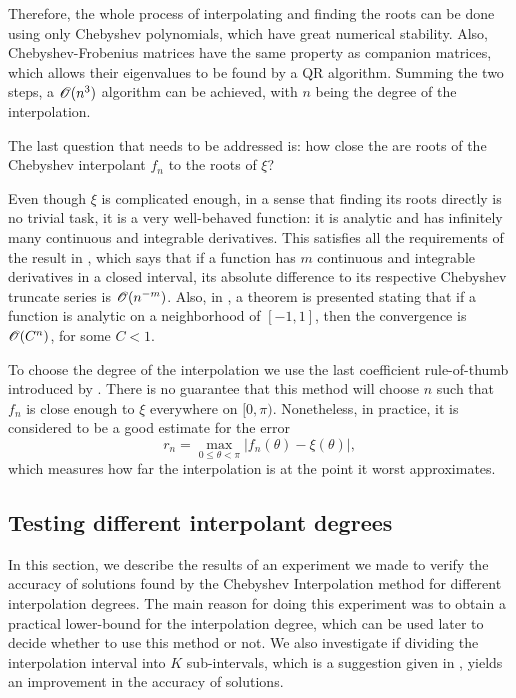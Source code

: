 Therefore, the whole process of interpolating and finding the roots can be done using only Chebyshev polynomials, which have great numerical stability. Also, Chebyshev-Frobenius matrices have the same property as companion matrices, which allows their eigenvalues to be found by a QR algorithm. Summing the two steps, a $\mathscr{O}(n^3)$ algorithm can be achieved, with $n$ being the degree of the interpolation.

The last question that needs to be addressed is: how close the are roots of the Chebyshev interpolant $f_n$ to the roots of $\xi$?

Even though $\xi$ is complicated enough, in a sense that finding its roots directly is no trivial task, it is a very well-behaved function: it is analytic and has infinitely many continuous and integrable derivatives. This satisfies all the requirements of the result in , which says that if a function has $m$ continuous and integrable derivatives in a closed interval, its absolute difference to its respective Chebyshev truncate series is $\mathscr{O}(n^{-m})$. Also, in , a theorem is presented stating that if a function is analytic on a neighborhood of $[-1, 1]$, then the convergence is $\mathscr{O}(C^n)$, for some $C<1$.

To choose the degree of the interpolation we use the last coefficient rule-of-thumb introduced by . There is no guarantee that this method will choose $n$ such that $f_n$ is close enough to $\xi$ everywhere on $[0, \pi)$. Nonetheless, in practice, it is considered to be a good estimate for the error
\begin{equation}
r_n = \max_{0 \le \theta < \pi} |f_n(\theta) - \xi(\theta)|,
\end{equation}
which measures how far the interpolation is at the point it worst approximates. 
\clearpage
\subsection{Testing different interpolant degrees}

In this section, we describe the results of an experiment we made to verify the accuracy of solutions found by the Chebyshev Interpolation method for different interpolation degrees. 
The main reason for doing this experiment was to obtain a practical lower-bound for the interpolation degree, which can be used later to decide whether to use this method or not. We also investigate if dividing the interpolation interval into $K$ sub-intervals, which is a suggestion given in , yields an improvement in the accuracy of solutions. 
 
